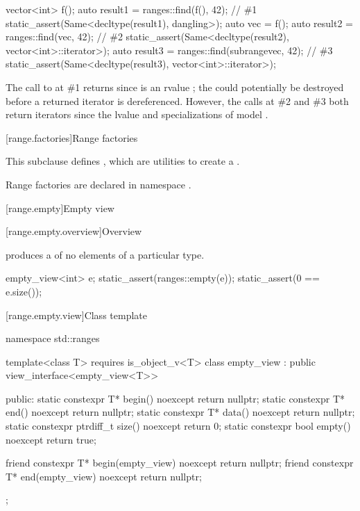 \pnum
\begin{example}
\begin{codeblock}
vector<int> f();
auto result1 = ranges::find(f(), 42);                                   // \#1
static_assert(Same<decltype(result1), dangling>);
auto vec = f();
auto result2 = ranges::find(vec, 42);                                   // \#2
static_assert(Same<decltype(result2), vector<int>::iterator>);
auto result3 = ranges::find(subrange{vec}, 42);                         // \#3
static_assert(Same<decltype(result3), vector<int>::iterator>);
\end{codeblock}
The call to  at \#1 returns 
since  is an rvalue ;
the  could potentially be destroyed
before a returned iterator is dereferenced.
However, the calls at \#2 and \#3 both return iterators
since the lvalue  and specializations of 
model .
\end{example}

[range.factories]{Range factories}

\pnum
This subclause defines ,
which are utilities to create a .

\pnum
Range factories are declared in namespace .

[range.empty]{Empty view}

[range.empty.overview]{Overview}

\pnum
{} produces a  of no elements of
a particular type.

\pnum
\begin{example}
\begin{codeblock}
empty_view<int> e;
static_assert(ranges::empty(e));
static_assert(0 == e.size());
\end{codeblock}
\end{example}

[range.empty.view]{Class template }

\begin{codeblock}
namespace std::ranges {
  template<class T>
    requires is_object_v<T>
  class empty_view : public view_interface<empty_view<T>> {
  public:
    static constexpr T* begin() noexcept { return nullptr; }
    static constexpr T* end() noexcept { return nullptr; }
    static constexpr T* data() noexcept { return nullptr; }
    static constexpr ptrdiff_t size() noexcept { return 0; }
    static constexpr bool empty() noexcept { return true; }

    friend constexpr T* begin(empty_view) noexcept { return nullptr; }
    friend constexpr T* end(empty_view) noexcept { return nullptr; }
  };
}
\end{codeblock}

